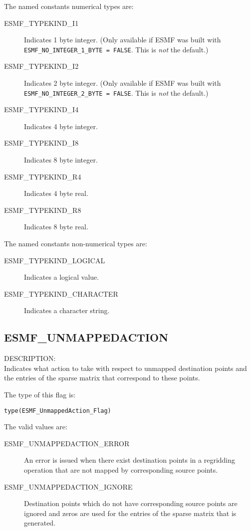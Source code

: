 The named constants numerical types are:
\begin{description}

\item [ESMF\_TYPEKIND\_I1]
      Indicates 1 byte integer. \newline
      (Only available if ESMF was built with 
      {\tt ESMF\_NO\_INTEGER\_1\_BYTE = FALSE}. This is {\em not} the default.)
\item [ESMF\_TYPEKIND\_I2]
      Indicates 2 byte integer. \newline
      (Only available if ESMF was built with 
      {\tt ESMF\_NO\_INTEGER\_2\_BYTE = FALSE}. This is {\em not} the default.)
\item [ESMF\_TYPEKIND\_I4]
      Indicates 4 byte integer.
\item [ESMF\_TYPEKIND\_I8]
      Indicates 8 byte integer.
\item [ESMF\_TYPEKIND\_R4]
      Indicates 4 byte real.
\item [ESMF\_TYPEKIND\_R8]
      Indicates 8 byte real.

\end{description}

The named constants non-numerical types are:
\begin{description}

\item [ESMF\_TYPEKIND\_LOGICAL]
      Indicates a logical value.
\item [ESMF\_TYPEKIND\_CHARACTER]
      Indicates a character string.

\end{description}

\subsection{ESMF\_UNMAPPEDACTION}
\label{const:unmappedaction}
{\sf DESCRIPTION:\\}
Indicates what action to take with respect to unmapped destination points
and the entries of the sparse matrix that correspond to these points.

The type of this flag is:

{\tt type(ESMF\_UnmappedAction\_Flag)}

The valid values are:
\begin{description}
	\item[ESMF\_UNMAPPEDACTION\_ERROR]
	An error is issued when there exist destination points in a regridding
	operation that are not mapped by corresponding source points.
	\item[ESMF\_UNMAPPEDACTION\_IGNORE]
	Destination points which do not have corresponding source points are 
	ignored and zeros are used for the entries of the sparse matrix
	that is generated.
\end{description}


